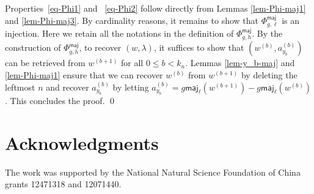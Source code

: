 \documentclass[12pt]{article}
\numberwithin{equation}{section}
\theoremstyle{plain}
\def\maj{\mathsf{maj}}
\begin{document}
  Properties~\eqref{eq-Phi1} and ~\eqref{eq-Phi2}  follow  directly from Lemmas \ref{lem-Phi-maj1}  and  \ref{lem-Phi-maj3}.  By cardinality reasons, it remains to show that $\Phi^{\maj}_{g,\ell}$ is an injection.      Here we retain  all the notations  in the definition of $\Phi^{\maj}_{g,h}$.   By the construction of $\Phi^{\maj}_{g,h}$, to recover $(w, \lambda)$, it suffices to show that  $(w^{(b)}, a^{(b)}_{y_b})$ can be retrieved from $w^{(b+1)}$ for all $0\leq b<k_n$.  Lemmas \ref{lem-y_b-maj} and  \ref{lem-Phi-maj1}  ensure that   we can recover $w^{(b)}$ from $w^{(b+1)}$  by deleting  the leftmost $n$ and recover $a^{(b)}_{y_b}$ by letting $a^{(b)}_{y_b}=g\maj_\ell(w^{(b+1)})-g\maj_{\ell}(w^{(b)})$. This concludes the proof.   \qed
   
  
  
  
  
  
  
  
  
  
  
  
  
  
  
  
  
  
  
  
  
  
  
   
   \section*{Acknowledgments}  
   The work  was supported by
   the National Natural
   Science Foundation of China grants 12471318 and 12071440.
  
  
  
  
 
	
	
\end{document}
